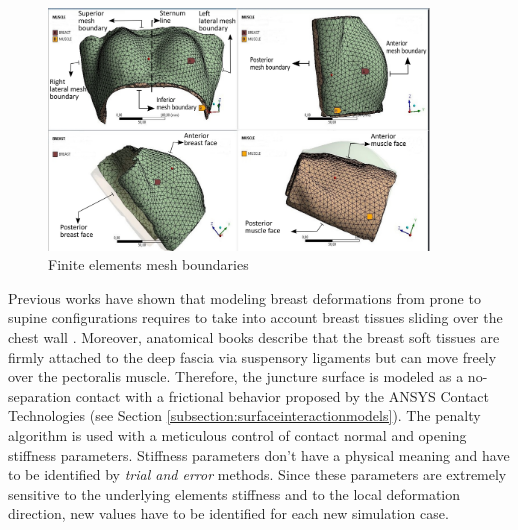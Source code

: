 \begin{figure}[!h]
\centering
\includegraphics[width=0.9\textwidth,keepaspectratio]{figures/mesh_parts_2.png} 
\caption{Finite elements mesh boundaries}\label{fig:meshboundaries}
\end{figure}

Previous works have shown that modeling breast deformations from prone to supine configurations requires to take into account breast tissues sliding over the chest wall \citep{carter_application_2012,han_nonlinear_2014}. Moreover, anatomical books \citep{mugea2014aesthetic,clemente2011anatomy}  describe that the breast soft tissues are firmly attached to the deep fascia via suspensory ligaments but can move freely over the pectoralis muscle.  Therefore, the juncture surface is modeled as a no-separation contact with a frictional behavior proposed by the ANSYS Contact Technologies (see Section \ref{subsection:surfaceinteractionmodels}). The penalty algorithm is used with a meticulous control of contact normal and opening stiffness parameters. Stiffness parameters don't have a physical meaning and have to be identified by \textit{trial and error} methods. Since these parameters are extremely sensitive to the underlying elements stiffness and to the local deformation direction, new values have to be identified for each new simulation case.    

